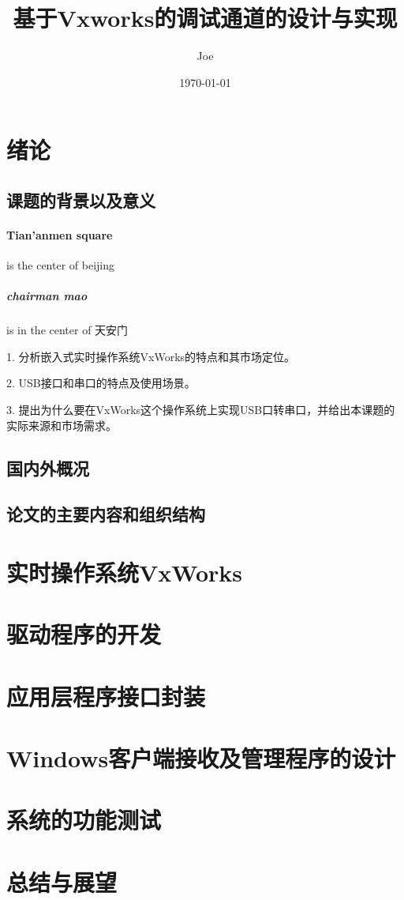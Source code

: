 \documentclass[UTF-8]{ctexart}
\title{基于Vxworks的调试通道的设计与实现}
\author{Joe}
\date{\today}
\begin{document}
\maketitle

\tableofcontents


\section{绪论} 



\subsection{课题的背景以及意义}

\paragraph{Tian'anmen square}
is the center of beijing
\subparagraph{chairman mao}
is in the center of 天安门

1. 分析嵌入式实时操作系统VxWorks的特点和其市场定位。

2. USB接口和串口的特点及使用场景。

3. 提出为什么要在VxWorks这个操作系统上实现USB口转串口，并给出本课题的实际来源和市场需求。

\subsection{国内外概况}


\subsection{论文的主要内容和组织结构}




\section{实时操作系统VxWorks}




\section{驱动程序的开发}



\section{应用层程序接口封装}


\section{Windows客户端接收及管理程序的设计}


\section{系统的功能测试}


\section{总结与展望}



\end{document}
